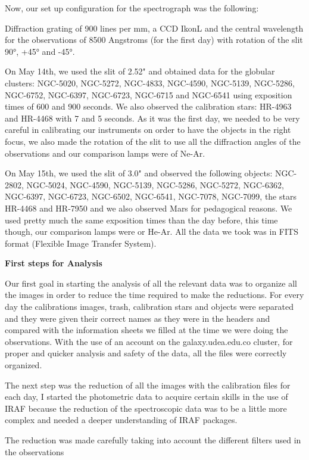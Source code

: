 \documentclass[english]{article}
\begin{document}
Now, our set up configuration for the spectrograph was the following:

Diffraction grating of 900 lines per mm, a CCD IkonL and the central wavelength for the observations of 8500 Angstroms (for the first day) with rotation of the slit 90°, +45° and -45°.

On May 14th, we used the slit of 2.52" and obtained data for the globular clusters: NGC-5020, NGC-5272, NGC-4833, NGC-4590, NGC-5139, NGC-5286, NGC-6752, NGC-6397, NGC-6723, NGC-6715 and NGC-6541 using exposition times of 600 and 900 seconds. We also observed the calibration stars: HR-4963 and HR-4468 with 7 and 5 seconds. As it was the first day, we needed to be very careful in calibrating our instruments on order to have the objects in the right focus, we also made the rotation of the slit to use all the diffraction angles of the observations and our comparison lamps were of Ne-Ar.

On May 15th, we used the slit of 3.0" and observed the following objects: NGC-2802, NGC-5024, NGC-4590, NGC-5139, NGC-5286, NGC-5272, NGC-6362, NGC-6397, NGC-6723, NGC-6502, NGC-6541, NGC-7078, NGC-7099, the stars HR-4468 and HR-7950 and we also observed Mars for pedagogical reasons. We used pretty much the same exposition times than the day before, this time though, our comparison lamps were or He-Ar. All the data we took was in FITS format (Flexible Image Transfer System).

\textbf{First steps for Analysis}

Our first goal in starting the analysis of all the relevant data was to organize all the images in order to reduce the time required to make the reductions. For every day the calibrations images, trash, calibration stars and objects were separated and they were given their correct names as they were in the headers and compared with the information sheets we filled at the time we were doing the observations. With the use of an account on the galaxy.udea.edu.co cluster, for proper and quicker analysis and safety of the data, all the files were correctly organized.

The next step was the reduction of all the images with the calibration files for each day, I started the photometric data to acquire certain skills in the use of IRAF because the reduction of the spectroscopic data was to be a little more complex and needed a deeper understanding of IRAF packages. 



The reduction was made carefully taking into account the different filters used in the observations 
\end{document}
